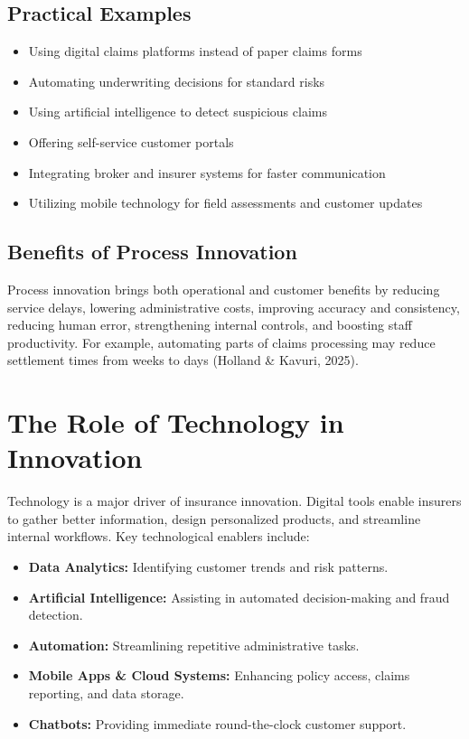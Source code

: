 \documentclass[12pt,a4paper]{article}
\begin{document}
\subsection{Practical Examples}
\begin{itemize}
    \item Using digital claims platforms instead of paper claims forms
    \item Automating underwriting decisions for standard risks
    \item Using artificial intelligence to detect suspicious claims
    \item Offering self-service customer portals
    \item Integrating broker and insurer systems for faster communication
    \item Utilizing mobile technology for field assessments and customer updates
\end{itemize}

\subsection{Benefits of Process Innovation}
Process innovation brings both operational and customer benefits by reducing service delays, lowering administrative costs, improving accuracy and consistency, reducing human error, strengthening internal controls, and boosting staff productivity. For example, automating parts of claims processing may reduce settlement times from weeks to days (Holland \& Kavuri, 2025).

\section{The Role of Technology in Innovation}

Technology is a major driver of insurance innovation. Digital tools enable insurers to gather better information, design personalized products, and streamline internal workflows. Key technological enablers include:
\begin{itemize}
    \item \textbf{Data Analytics:} Identifying customer trends and risk patterns.
    \item \textbf{Artificial Intelligence:} Assisting in automated decision-making and fraud detection.
    \item \textbf{Automation:} Streamlining repetitive administrative tasks.
    \item \textbf{Mobile Apps \& Cloud Systems:} Enhancing policy access, claims reporting, and data storage.
    \item \textbf{Chatbots:} Providing immediate round-the-clock customer support.
\end{itemize}
\end{document}

